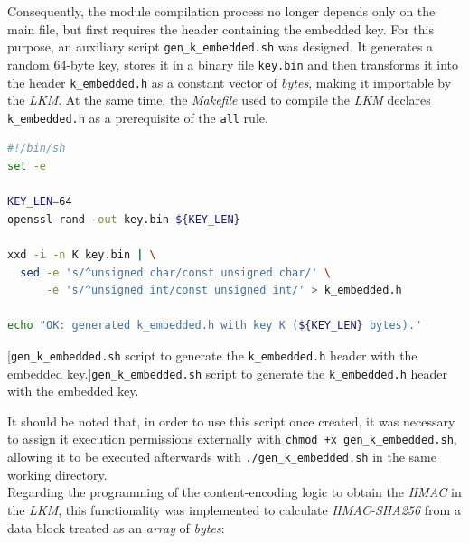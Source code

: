 Consequently, the module compilation process no longer depends only on the main file, but first requires the header containing the embedded key.
For this purpose, an auxiliary script \verb|gen_k_embedded.sh| was designed. It generates a random 64-byte key, stores it in a binary file \verb|key.bin| and then transforms it into the header \verb|k_embedded.h| as a constant vector of \textit{bytes}, making it importable by the \textit{LKM}.
At the same time, the \textit{Makefile} used to compile the \textit{LKM} declares \verb|k_embedded.h| as a prerequisite of the \verb|all| rule.\\

\begin{lstlisting}[language=sh]
#!/bin/sh
set -e

KEY_LEN=64
openssl rand -out key.bin ${KEY_LEN}

xxd -i -n K key.bin | \
  sed -e 's/^unsigned char/const unsigned char/' \
      -e 's/^unsigned int/const unsigned int/' > k_embedded.h

echo "OK: generated k_embedded.h with key K (${KEY_LEN} bytes)."
\end{lstlisting}
\captionsetup{type=code,justification=centering,singlelinecheck=false}
\captionof{code}[\texttt{gen\_k\_embedded.sh} script to generate the \texttt{k\_embedded.h} header with the embedded key.]{\texttt{gen\_k\_embedded.sh} script to generate the \texttt{k\_embedded.h} header with the embedded key.}
\label{cod:gen_k_embedded}
\vspace{\baselineskip}

It should be noted that, in order to use this script once created, it was necessary to assign it execution permissions externally with \verb|chmod +x gen_k_embedded.sh|, allowing it to be executed afterwards with \verb|./gen_k_embedded.sh| in the same working directory.\\

Regarding the programming of the content-encoding logic to obtain the \textit{HMAC} in the \textit{LKM}, this functionality was implemented to calculate \textit{HMAC-SHA256} from a data block treated as an \textit{array} of \textit{bytes}:

